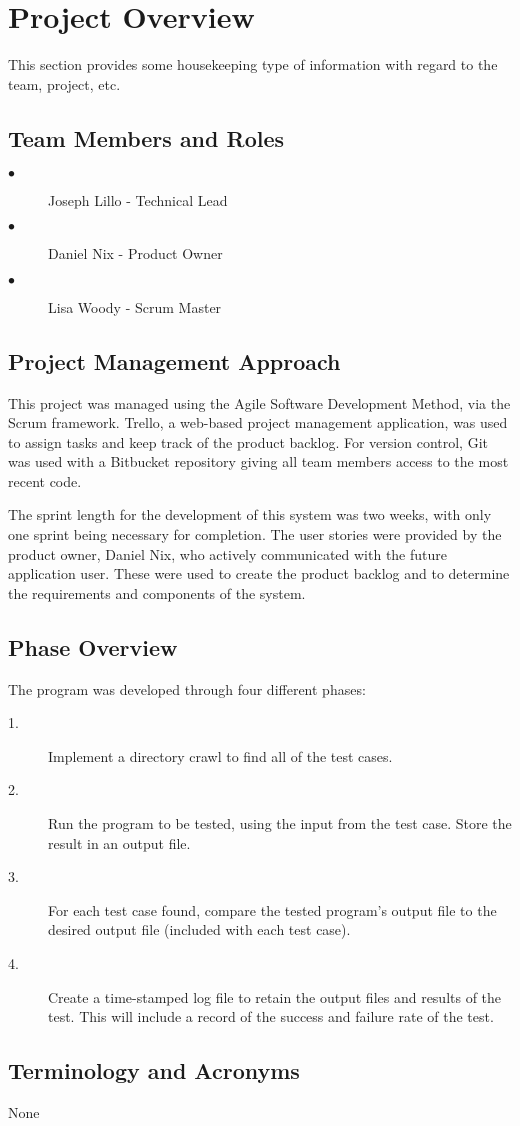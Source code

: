 

\chapter{Project Overview}
This section provides some housekeeping type of information with regard to the 
team, project, etc. 



\section{Team Members and Roles}
\begin{description}
\item[$\bullet$ ] Joseph Lillo - Technical Lead
\item[$\bullet$ ] Daniel Nix - Product Owner
\item[$\bullet$ ] Lisa Woody - Scrum Master
\end{description}




\section{Project  Management Approach}
This project was managed using the Agile Software Development Method, via the Scrum framework.
Trello, a web-based project management application, was used to assign tasks and keep track of 
the product backlog.  For version control, Git was used with a Bitbucket repository giving all 
team members access to the most recent code.

The sprint length for the development of this system was two weeks, with
only one sprint being necessary for completion.  The user stories were provided by the product 
owner, Daniel Nix, who actively communicated with the future application user.  These were used
to create the product backlog and to determine the requirements and components of the system.


\section{Phase  Overview}
The program was developed through four different phases:
\begin{description}
\item[1. ] Implement a directory crawl to find all of the test cases.
\item[2. ] Run the program to be tested, using the input from the test case. Store the result in an output file.
\item[3. ] For each test case found, compare the tested program's output file to the desired output file (included with each test case).
\item[4. ] Create a time-stamped log file to retain the output files and results of the test.  This will include a record of the success and failure rate of the test.
\end{description}


\section{Terminology and Acronyms}
None
